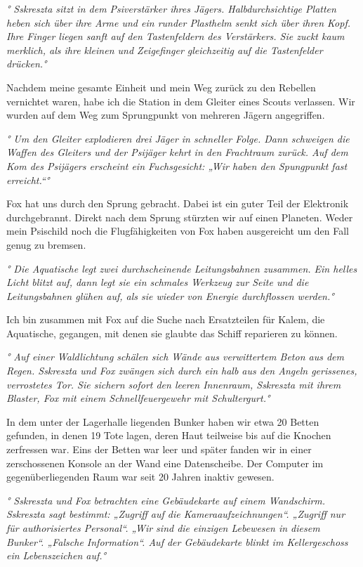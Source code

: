 \documentclass[11pt]{scrartcl}
\begin{document}
\emph{° Sskreszta sitzt in dem Psiverstärker ihres Jägers.
Halbdurchsichtige Platten heben sich über ihre Arme und ein runder
Plasthelm senkt sich über ihren Kopf. Ihre Finger liegen sanft auf den
Tastenfeldern des Verstärkers. Sie zuckt kaum merklich, als ihre kleinen
und Zeigefinger gleichzeitig auf die Tastenfelder drücken.°}

Nachdem meine gesamte Einheit und mein Weg zurück zu den Rebellen
vernichtet waren, habe ich die Station in dem Gleiter eines Scouts
verlassen. Wir wurden auf dem Weg zum Sprungpunkt von mehreren Jägern
angegriffen.

\emph{° Um den Gleiter explodieren drei Jäger in schneller Folge. Dann
schweigen die Waffen des Gleiters und der Psijäger kehrt in den
Frachtraum zurück. Auf dem Kom des Psijägers erscheint ein Fuchsgesicht:
„Wir haben den Spungpunkt fast erreicht.``°}

Fox hat uns durch den Sprung gebracht. Dabei ist ein guter Teil der
Elektronik durchgebrannt. Direkt nach dem Sprung stürzten wir auf einen
Planeten. Weder mein Psischild noch die Flugfähigkeiten von Fox haben
ausgereicht um den Fall genug zu bremsen.

\emph{° Die Aquatische legt zwei durchscheinende Leitungsbahnen
zusammen. Ein helles Licht blitzt auf, dann legt sie ein schmales
Werkzeug zur Seite und die Leitungsbahnen glühen auf, als sie wieder von
Energie durchflossen werden.°}

Ich bin zusammen mit Fox auf die Suche nach Ersatzteilen für Kalem, die
Aquatische, gegangen, mit denen sie glaubte das Schiff reparieren zu
können.

\emph{° Auf einer Waldlichtung schälen sich Wände aus verwittertem Beton
aus dem Regen. Sskreszta und Fox zwängen sich durch ein halb aus den
Angeln gerissenes, verrostetes Tor. Sie sichern sofort den leeren
Innenraum, Sskreszta mit ihrem Blaster, Fox mit einem Schnellfeuergewehr
mit Schultergurt.°}

In dem unter der Lagerhalle liegenden Bunker haben wir etwa 20 Betten
gefunden, in denen 19 Tote lagen, deren Haut teilweise bis auf die
Knochen zerfressen war. Eins der Betten war leer und später fanden wir
in einer zerschossenen Konsole an der Wand eine Datenscheibe. Der
Computer im gegenüberliegenden Raum war seit 20 Jahren inaktiv gewesen.

\emph{° Sskreszta und Fox betrachten eine Gebäudekarte auf einem
Wandschirm. Sskreszta sagt bestimmt: „Zugriff auf die
Kameraaufzeichnungen``. „Zugriff nur für authorisiertes Personal``. „Wir
sind die einzigen Lebewesen in diesem Bunker``. „Falsche Information``.
Auf der Gebäudekarte blinkt im Kellergeschoss ein Lebenszeichen auf.°}
\end{document}
